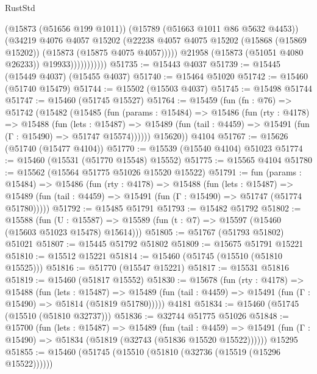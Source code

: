 \begin{lexlean}{RustStd}
\begin{coremodule}
                            (@15873 (@51656 @199 @1011))
                            (@15789 (@51663 @1011 @86 @5632 @4453))
                            (@34219
                              @4076
                              @4057
                              @15202
                              (@22238
                                @4057
                                @4075
                                @15202
                                (@15868 (@15869 @15202))
                                (@15873 (@15875 @4075 @4057)))))
                          @21958
                          (@15873 (@51051 @4080 @26233))
                          @19933)))))))))))
@51735 := @15443 @4037
@51739 := @15445 (@15449 @4037) (@15455 @4037)
@51740 := @15464 @51020
@51742 := @15460 (@51740 @15479)
@51744 := @15502 (@15503 @4037)
@51745 := @15498 @51744
@51747 := @15460 (@51745 @15527)
@51764 := @15459
    (fun (fn : @76) =>
    @51742
      (@15482
        (@15485
          (fun (params : @15484) =>
          @15486
            (fun (rty : @4178) =>
            @15488
              (fun (lets : @15487) =>
              @15489 (fun (tail : @4459) => @15491 (fun (Γ : @15490) => @51747 @15574))))))
        @15620))
    @4104
@51767 := @15626 (@51740 (@15477 @4104))
@51770 := @15539 (@15540 @4104) @51023
@51774 := @15460 (@15531 (@51770 @15548) @15552)
@51775 := @15565 @4104
@51780 := @15562 (@15564 @51775 @51026 @15520 @15522)
@51791 := fun (params : @15484) =>
  @15486
    (fun (rty : @4178) =>
    @15488
      (fun (lets : @15487) =>
      @15489 (fun (tail : @4459) => @15491 (fun (Γ : @15490) => @51747 (@51774 @51780)))))
@51792 := @15485 @51791
@51793 := @15482 @51792
@51802 := @15588
    (fun (U : @15587) => @15589 (fun (t : @7) => @15597 (@15460 (@15603 @51023 @15478) @15614)))
@51805 := @51767 (@51793 @51802) @51021
@51807 := @15445 @51792 @51802
@51809 := @15675 @51791 @15221
@51810 := @15512 @15221
@51814 := @15460 (@51745 (@15510 (@51810 @15525)))
@51816 := @51770 (@15547 @15221)
@51817 := @15531 @51816
@51819 := @15460 (@51817 @15552)
@51830 := @15678
    (fun (rty : @4178) =>
    @15488
      (fun (lets : @15487) =>
      @15489 (fun (tail : @4459) => @15491 (fun (Γ : @15490) => @51814 (@51819 @51780)))))
    @4181
@51834 := @15460 (@51745 (@15510 (@51810 @32737)))
@51836 := @32744 @51775 @51026
@51848 := @15700
    (fun (lets : @15487) =>
    @15489
      (fun (tail : @4459) =>
      @15491 (fun (Γ : @15490) => @51834 (@51819 (@32743 (@51836 @15520 @15522))))))
    @15295
@51855 := @15460 (@51745 (@15510 (@51810 (@32736 (@15519 (@15296 @15522))))))

\end{coremodule}
\end{lexlean}
